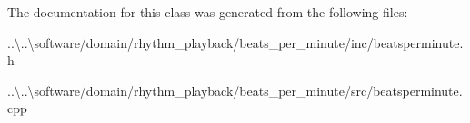 The documentation for this class was generated from the following files\+:\begin{DoxyCompactItemize}
\item 
..\textbackslash{}..\textbackslash{}software/domain/rhythm\+\_\+playback/beats\+\_\+per\+\_\+minute/inc/beatsperminute.\+h\item 
..\textbackslash{}..\textbackslash{}software/domain/rhythm\+\_\+playback/beats\+\_\+per\+\_\+minute/src/beatsperminute.\+cpp\end{DoxyCompactItemize}
